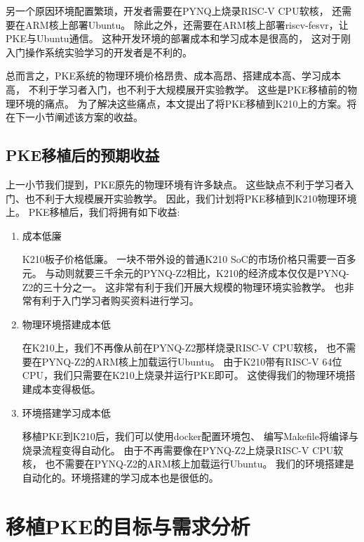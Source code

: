 另一个原因环境配置繁琐，开发者需要在PYNQ上烧录RISC-V CPU软核，
还需要在ARM核上部署Ubuntu。
除此之外，还需要在ARM核上部署riscv-fesvr，让PKE与Ubuntu通信。
这种开发环境的部署成本和学习成本是很高的，
这对于刚入门操作系统实验学习的开发者是不利的。

总而言之，PKE系统的物理环境价格昂贵、成本高昂、搭建成本高、学习成本高，
不利于学习者入门，也不利于大规模展开实验教学。\cite{2021Reform}
这些是PKE移植前的物理环境的痛点。
为了解决这些痛点，本文提出了将PKE移植到K210上的方案。将在下一小节阐述该方案的收益。

\subsection{PKE移植后的预期收益}

上一小节我们提到，PKE原先的物理环境有许多缺点。
这些缺点不利于学习者入门、也不利于大规模展开实验教学。
因此，我们计划将PKE移植到K210物理环境上。
PKE移植后，我们将拥有如下收益:

\begin{enumerate}
    \item 成本低廉
    
    K210板子价格低廉。
    一块不带外设的普通K210 SoC的市场价格只需要一百多元。
    与动则就要三千余元的PYNQ-Z2相比，K210的经济成本仅仅是PYNQ-Z2的三十分之一。
    这非常有利于我们开展大规模的物理环境实验教学。
    也非常有利于入门学习者购买资料进行学习。

    \item 物理环境搭建成本低
    
    在K210上，我们不再像从前在PYNQ-Z2那样烧录RISC-V CPU软核，
    也不需要在PYNQ-Z2的ARM核上加载运行Ubuntu。
    由于K210带有RISC-V 64位CPU，我们只需要在K210上烧录并运行PKE即可。
    这使得我们的物理环境搭建成本变得极低。

    \item 环境搭建学习成本低
    
    移植PKE到K210后，我们可以使用docker配置环境包、
    编写Makefile将编译与烧录流程变得自动化。
    由于不再需要像在PYNQ-Z2上烧录RISC-V CPU软核，
    也不需要在PYNQ-Z2的ARM核上加载运行Ubuntu。
    我们的环境搭建是自动化的。环境搭建的学习成本也是很低的。

\end{enumerate}


\section{移植PKE的目标与需求分析}

